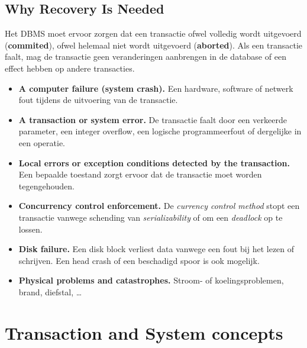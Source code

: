 \subsection{Why Recovery Is Needed}
Het DBMS moet ervoor zorgen dat een transactie ofwel volledig wordt uitgevoerd (\textbf{commited}), ofwel helemaal niet wordt uitgevoerd (\textbf{aborted}). Als een transactie faalt, mag de transactie geen veranderingen aanbrengen in de database of een effect hebben op andere transacties.
\begin{itemize}
	\item \textbf{A computer failure (system crash).} Een hardware, software of netwerk fout tijdens de uitvoering van de transactie.
	\item \textbf{A transaction or system error.} De transactie faalt door een verkeerde parameter, een integer overflow, een logische programmeerfout of dergelijke in een operatie.
	\item \textbf{Local errors or exception conditions detected by the transaction.} Een bepaalde toestand zorgt ervoor dat de transactie moet worden tegengehouden.
	\item \textbf{Concurrency control enforcement.} De \textit{currency control method} stopt een transactie vanwege schending van \textit{serializability} of om een \textit{deadlock} op te lossen. 
	\item \textbf{Disk failure.} Een disk block verliest data vanwege een fout bij het lezen of schrijven. Een head crash of een beschadigd spoor is ook mogelijk.
	\item \textbf{Physical problems and catastrophes.} Stroom- of koelingsproblemen, brand, diefstal, \dots
\end{itemize}



\section{Transaction and System concepts}
